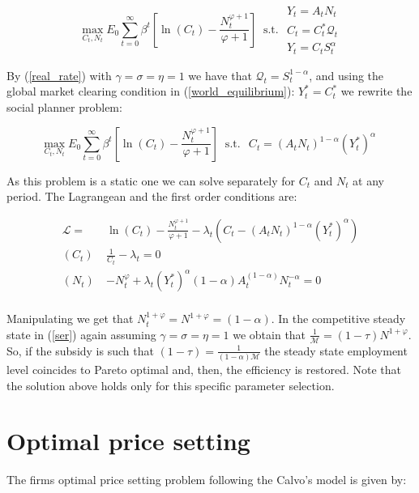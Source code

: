 \documentclass{article}
\begin{document}
$$\max_{C_t, N_t} E_0 \sum^\infty_{t=0} \beta^t \left[\ln(C_t) - \frac{N_t^{\varphi+1}}{\varphi+1} \right] \ \textrm{ s.t. } \begin{matrix}
    Y_t = A_t N_t\\
    C_t = C_t^* \mathcal Q_{t}\\
    Y_t = C_t S_t^\alpha
\end{matrix}$$

By (\ref{real_rate}) with $\gamma = \sigma = \eta = 1$ we have that $\mathcal{Q}_t = S_t^{1-\alpha}$, and using the global market clearing condition in (\ref{world_equilibrium}): $Y_t^* = C_t^*$ we rewrite the social planner problem:

$$\max_{C_t, N_t} E_0 \sum^\infty_{t=0} \beta^t \left[\ln(C_t) - \frac{N_t^{\varphi+1}}{\varphi+1} \right] \ \textrm{ s.t. } \begin{matrix}
    C_t = (A_t N_t)^{1-\alpha}(Y_t^*)^\alpha
\end{matrix}$$

As this problem is a static one we can solve separately for $C_t$ and $N_t$ at any period. The Lagrangean and the first order conditions are:

\begin{equation*}
    \begin{split}
        \mathcal L = & \ln(C_t) - \frac{N_t^{\varphi+1}}{\varphi+1} - \lambda_t(C_t - (A_t N_t)^{1-\alpha}(Y_t^*)^\alpha) \\
        (C_t) \ & \frac{1}{C_t} - \lambda_t = 0\\
        (N_t) \ & -N_t^\varphi + \lambda_t (Y_t^*)^\alpha (1 - \alpha) A_t^{(1 - \alpha)}N_t^{-\alpha} = 0\\
    \end{split}
\end{equation*}

Manipulating we get that $N_t^{1+\varphi} = N^{1+\varphi} = (1-\alpha)$. In the competitive steady state in (\ref{ser}) again assuming $\gamma = \sigma = \eta = 1$ we obtain that $\frac{1}{\mathcal M} = (1-\tau) N^{1+\varphi}$. So, if the subsidy is such that $(1-\tau) = \frac{1}{(1-\alpha) \mathcal M}$ the steady state employment level coincides to Pareto optimal and, then, the efficiency is restored. Note that the solution above holds only for this specific parameter selection.

\section{Optimal price setting}
The firms optimal price setting problem following the Calvo's model is given by:
\end{document}
